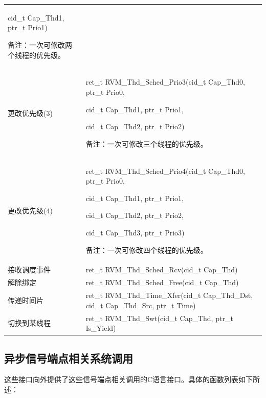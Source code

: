 \begin{xltabular}{\textwidth}{@{}>{\hsize\raggedright\arraybackslash}X>{\hsize\raggedright\arraybackslash}X@{}}
cid\_\allowbreak{}t Cap\_\allowbreak{}Thd1, ptr\_\allowbreak{}t Prio1)

备注：一次可修改两个线程的优先级。\strut
\tabularnewline
更改优先级(3)\strut
 & ret\_\allowbreak{}t RVM\_\allowbreak{}Thd\_\allowbreak{}Sched\_\allowbreak{}Prio3(cid\_\allowbreak{}t Cap\_\allowbreak{}Thd0, ptr\_\allowbreak{}t Prio0,

cid\_\allowbreak{}t Cap\_\allowbreak{}Thd1, ptr\_\allowbreak{}t Prio1,

cid\_\allowbreak{}t Cap\_\allowbreak{}Thd2, ptr\_\allowbreak{}t Prio2)

备注：一次可修改三个线程的优先级。\strut
\tabularnewline
更改优先级(4)\strut
 & ret\_\allowbreak{}t RVM\_\allowbreak{}Thd\_\allowbreak{}Sched\_\allowbreak{}Prio4(cid\_\allowbreak{}t Cap\_\allowbreak{}Thd0, ptr\_\allowbreak{}t Prio0,

cid\_\allowbreak{}t Cap\_\allowbreak{}Thd1, ptr\_\allowbreak{}t Prio1,

cid\_\allowbreak{}t Cap\_\allowbreak{}Thd2, ptr\_\allowbreak{}t Prio2,

cid\_\allowbreak{}t Cap\_\allowbreak{}Thd3, ptr\_\allowbreak{}t Prio3)

备注：一次可修改四个线程的优先级。\strut
\tabularnewline
接收调度事件 & ret\_\allowbreak{}t RVM\_\allowbreak{}Thd\_\allowbreak{}Sched\_\allowbreak{}Rcv(cid\_\allowbreak{}t
Cap\_\allowbreak{}Thd)\tabularnewline
解除绑定 & ret\_\allowbreak{}t RVM\_\allowbreak{}Thd\_\allowbreak{}Sched\_\allowbreak{}Free(cid\_\allowbreak{}t Cap\_\allowbreak{}Thd)\tabularnewline
传递时间片 & ret\_\allowbreak{}t RVM\_\allowbreak{}Thd\_\allowbreak{}Time\_\allowbreak{}Xfer(cid\_\allowbreak{}t Cap\_\allowbreak{}Thd\_\allowbreak{}Dst, cid\_\allowbreak{}t
Cap\_\allowbreak{}Thd\_\allowbreak{}Src, ptr\_\allowbreak{}t Time)\tabularnewline
切换到某线程 & ret\_\allowbreak{}t RVM\_\allowbreak{}Thd\_\allowbreak{}Swt(cid\_\allowbreak{}t Cap\_\allowbreak{}Thd, ptr\_\allowbreak{}t
Is\_\allowbreak{}Yield)\tabularnewline
\end{xltabular}

\subsection{异步信号端点相关系统调用}\label{subsec:3-5-6}

这些接口向外提供了这些信号端点相关调用的C语言接口。具体的函数列表如下所述：

